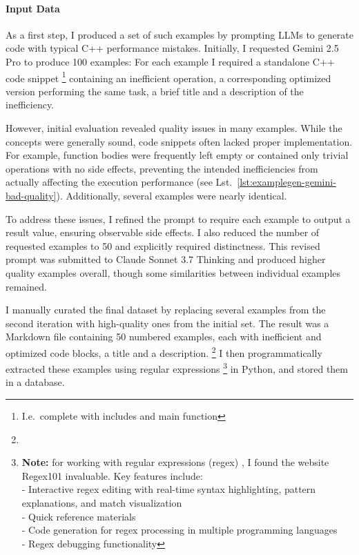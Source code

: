 \paragraph{Input Data}
As a first step, I produced a set of such examples by prompting LLMs to generate code with typical C++ performance mistakes.
Initially, I requested Gemini 2.5 Pro to produce 100 examples:
For each example I required a standalone C++ code snippet%
\footnote{I.e.\ complete with includes and main function}
containing an inefficient operation, a corresponding optimized version performing the same task, a brief title and a description of the inefficiency.

However, initial evaluation revealed quality issues in many examples.
While the concepts were generally sound, code snippets often lacked proper implementation.
For example, function bodies were frequently left empty or contained only trivial operations with no side effects, preventing the intended inefficiencies from actually affecting the execution performance (see Lst.\ \ref{lst:examplegen-gemini-bad-quality}).
Additionally, several examples were nearly identical.

To address these issues, I refined the prompt to require each example to output a result value, ensuring observable side effects.
I also reduced the number of requested examples to 50 and explicitly required distinctness.
This revised prompt was submitted to Claude Sonnet 3.7 Thinking and produced higher quality examples overall, though some similarities between individual examples remained.

I manually curated the final dataset by replacing several examples from the second iteration with high-quality ones from the initial set.
The result was a Markdown file containing 50 numbered examples, each with inefficient and optimized code blocks, a title and a description.%
\footnote{}
I then programmatically extracted these examples using regular expressions%
\footnote{
  \textbf{Note:} for working with regular expressions (regex) \cite{regex-spec}, I found the website Regex101 \cite{regex101} invaluable. Key features include:\\%
  - Interactive regex editing with real-time syntax highlighting, pattern explanations, and match visualization\\%
  - Quick reference materials\\%
  - Code generation for regex processing in multiple programming languages\\%
  - Regex debugging functionality
}
in Python, and stored them in a database.

